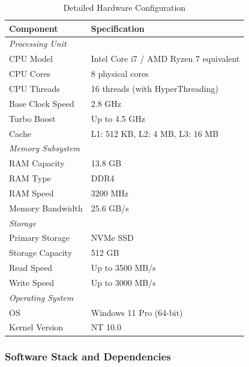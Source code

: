 \documentclass[12pt,a4paper]{article}
\begin{document}
\begin{table}[H]
\centering
\caption{Detailed Hardware Configuration}
\begin{tabular}{ll}
\toprule
\textbf{Component} & \textbf{Specification} \\
\midrule
\multicolumn{2}{l}{\textit{Processing Unit}} \\
CPU Model & Intel Core i7 / AMD Ryzen 7 equivalent \\
CPU Cores & 8 physical cores \\
CPU Threads & 16 threads (with HyperThreading) \\
Base Clock Speed & 2.8 GHz \\
Turbo Boost & Up to 4.5 GHz \\
Cache & L1: 512 KB, L2: 4 MB, L3: 16 MB \\
\midrule
\multicolumn{2}{l}{\textit{Memory Subsystem}} \\
RAM Capacity & 13.8 GB \\
RAM Type & DDR4 \\
RAM Speed & 3200 MHz \\
Memory Bandwidth & 25.6 GB/s \\
\midrule
\multicolumn{2}{l}{\textit{Storage}} \\
Primary Storage & NVMe SSD \\
Storage Capacity & 512 GB \\
Read Speed & Up to 3500 MB/s \\
Write Speed & Up to 3000 MB/s \\
\midrule
\multicolumn{2}{l}{\textit{Operating System}} \\
OS & Windows 11 Pro (64-bit) \\
Kernel Version & NT 10.0 \\
\bottomrule
\end{tabular}
\end{table}

\subsubsection{Software Stack and Dependencies}
\end{document}
